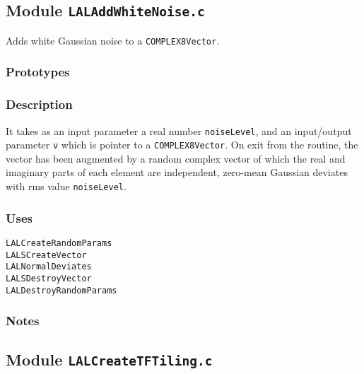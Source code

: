\newpage
\subsection{Module \texttt{LALAddWhiteNoise.c}}
\label{ss:LALAddWhiteNoise.c}

Adds white Gaussian noise to a \verb+COMPLEX8Vector+.  

\subsubsection*{Prototypes}
\vspace{0.1in}


\subsubsection*{Description}
It takes as an input parameter a real number \verb+noiseLevel+, and an
input/output parameter \verb+v+ which is pointer to a \verb+COMPLEX8Vector+.
On exit from the routine, the vector has been augmented by a random complex
vector of which the real and imaginary parts of each element are independent,
zero-mean Gaussian deviates with rms value \verb+noiseLevel+.

\subsubsection*{Uses}
\begin{verbatim}
LALCreateRandomParams
LALSCreateVector
LALNormalDeviates
LALSDestroyVector
LALDestroyRandomParams
\end{verbatim}

\subsubsection*{Notes}

\vfill{\footnotesize}

\newpage
\subsection{Module \texttt{LALCreateTFTiling.c}}
\label{ss:LALCreateTFTiling.c}

